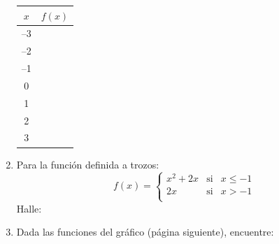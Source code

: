 \documentclass[fleqn]{article}
\begin{document}
\begin{enumerate}
\begin{minipage}{0.5\textwidth}
\begin{tabular}{|c|c|}\hline
$x$ & $f(x)$\\ \hline
--3 & \\ \hline
--2 & \\ \hline
--1 & \\ \hline
0 & \\ \hline
1 & \\ \hline
2 & \\ \hline
3 & \\ \hline
\end{tabular}
\end{minipage}\hfill
\begin{minipage}{0.45\textwidth}
\end{minipage}
\item Para la función definida a trozos:
\[f(x)=\left\{ \begin{array}{lcl}
              x^{2}+2x & \mbox{si} & x\leq-1\\
              2x & \mbox{si} & x>-1\\
             \end{array}
\right. \]
Halle:
\begin{enumerate}
\end{enumerate}
\item Dada las funciones del gráfico (página siguiente), encuentre:


\end{enumerate}
\end{document}
